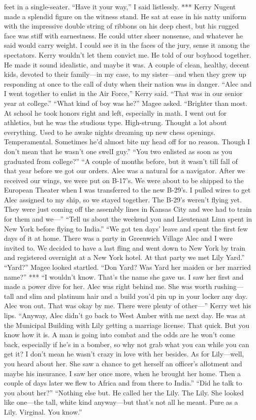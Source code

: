 \documentclass{novel}
\begin{document}
feet in a single-seater. “Have it your way,” I said listlessly. *** Kerry Nugent made a splendid figure on the witness stand. He sat at ease in his natty uniform with the impressive double string of ribbons on his deep chest, but his rugged face was stiff with earnestness. He could utter sheer nonsense, and whatever he said would carry weight. I could see it in the faces of the jury, sense it among the spectators. Kerry wouldn’t let them convict me. He told of our boyhood together. He made it sound idealistic, and maybe it was. A couple of clean, healthy, decent kids, devoted to their family—in my case, to my sister—and when they grew up responding at once to the call of duty when their nation was in danger. “Alec and I went together to enlist in the Air Force,” Kerry said. “That was in our senior year at college.” “What kind of boy was he?” Magee asked. “Brighter than most. At school he took honors right and left, especially in math. I went out for athletics, but he was the studious type. High-strung. Thought a lot about everything. Used to he awake nights dreaming up new chess openings. Temperamental. Sometimes he’d almost bite my head off for no reason. Though I don’t mean that he wasn’t one swelI guy.” “You two enlisted as soon as you graduated from college?” “A couple of months before, but it wasn’t till fall of that year before we got our orders. Alec was a natural for a navigator. After we received our wings, we were put on B-17’s. We were about to be shipped to the European Theater when I was transferred to the new B-29’s. I pulled wires to get Alec assigned to my ship, so we stayed together. The B-29’s weren’t flying yet. They were just coming off the assembly lines in Kansas City and wee had to train for them and we—” “Tell us about the weekend you and Lieutenant Linn spent in New York before flying to India.” “We got ten days’ leave and spent the first few days of it at home. There was a party in Greenwich Village Alec and I were invited to. We decided to have a last fling and went down to New York by train and registered overnight at a New York hotel. At that party we met Lily Yard.” “Yard?” Magee looked startled. “Don Yard? Was Yard her maiden or her married name?” *** “I wouldn’t know. That’s the name she gave us. I saw her first and made a power dive for her. Alec was right behind me. She was worth rushing—tall and slim and platinum hair and a build you’d pin up in your locker any day. Alec won out. That was okay by me. There were plenty of other—” Kerry wet his lips. “Anyway, Alec didn’t go back to West Amber with me next day. He was at the Municipal Building with Lily getting a marriage license. That quick. But you know how it is. A man is going into combat and the odds are he won’t come back, especially if he’s in a bomber, so why not grab what you can while you can get it? I don’t mean he wasn’t crazy in love with her besides. As for Lily—well, you heard about her. She saw a chance to get herself an officer’s allotment and maybe his insurance. I saw her once more, when he brought her home. Then a couple of days later we flew to Africa and from there to India.” “Did he talk to you about her?” “Nothing else but. He called her the Lily. The Lily. She looked like one—the tall, white kind anyway—but that’s not all he meant. Pure as a Lily. Virginal. You know.” 
\end{document}
